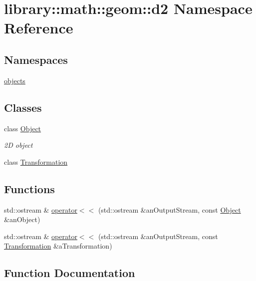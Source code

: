 \hypertarget{namespacelibrary_1_1math_1_1geom_1_1d2}{}\section{library\+:\+:math\+:\+:geom\+:\+:d2 Namespace Reference}
\label{namespacelibrary_1_1math_1_1geom_1_1d2}
\subsection*{Namespaces}
\begin{DoxyCompactItemize}
\item 
 \hyperlink{namespacelibrary_1_1math_1_1geom_1_1d2_1_1objects}{objects}
\end{DoxyCompactItemize}
\subsection*{Classes}
\begin{DoxyCompactItemize}
\item 
class \hyperlink{classlibrary_1_1math_1_1geom_1_1d2_1_1_object}{Object}
\begin{DoxyCompactList}\small\item\em 2D object \end{DoxyCompactList}\item 
class \hyperlink{classlibrary_1_1math_1_1geom_1_1d2_1_1_transformation}{Transformation}
\end{DoxyCompactItemize}
\subsection*{Functions}
\begin{DoxyCompactItemize}
\item 
std\+::ostream \& \hyperlink{namespacelibrary_1_1math_1_1geom_1_1d2_a6beada2a5f10daeb079c88a2de03750f}{operator$<$$<$} (std\+::ostream \&an\+Output\+Stream, const \hyperlink{classlibrary_1_1math_1_1geom_1_1d2_1_1_object}{Object} \&an\+Object)
\item 
std\+::ostream \& \hyperlink{namespacelibrary_1_1math_1_1geom_1_1d2_a6f2a72541663c2b2792a08e2bff504ed}{operator$<$$<$} (std\+::ostream \&an\+Output\+Stream, const \hyperlink{classlibrary_1_1math_1_1geom_1_1d2_1_1_transformation}{Transformation} \&a\+Transformation)
\end{DoxyCompactItemize}


\subsection{Function Documentation}
\mbox{\label{namespacelibrary_1_1math_1_1geom_1_1d2_a6beada2a5f10daeb079c88a2de03750f}} 
